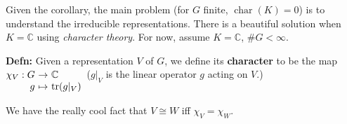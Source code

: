 \documentclass[10pt,letterpaper]{article}
\newcommand{\n}{\hfill\break}
\newcommand{\hangblock}[2]{\par\noindent\settowidth{\hangindent}{\textbf{#1: }}\textbf{#1: }\!\!\!#2}
\newcommand{\defn}[1]{\hangblock{Defn}{#1}}
\newcommand{\complex}{\mathbb{C}}
\newcommand{\C}{\complex}
\newcommand{\map}[4]{\!\!\!\begin{array}[t]{rcl}#1 & \!\!\!\!\to & \!\!\!\!#2\\ #3 & \!\!\!\!\mapsto & \!\!\!\!#4\end{array}}
\DeclareMathOperator{\tr}{tr}
\DeclareMathOperator{\fchar}{char}
\begin{document}
\par\noindent
Given the corollary, the main problem (for $G$ finite, $\fchar(K)=0$) is to understand the irreducible representations. There is a beautiful solution when $K=\C$ using \textit{character theory}. For now, assume $K=\C$, $\#G<\infty$.\n

\defn{
	Given a representation $V$ of $G$, we define its \textbf{character} to be the map $\map{\chi_{V}:G}{\C}{g}{\tr(g|_{V})}$\n ($g|_{V}$ is the linear operator $g$ acting on $V$.)\n
}

\par\noindent
We have the really cool fact that $V\cong{}W$ iff $\chi_{V}=\chi_{W}$.
\end{document}

